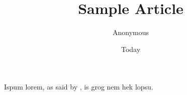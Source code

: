 \documentclass[11pt]{article}
\begin{document}
\title{Sample Article}
\author{Anonymous}
\date{Today}
\maketitlez

Ispum lorem, as said by \cite{Bloggs70}, is grog nem hek lopsu.

{}

\end{document}
